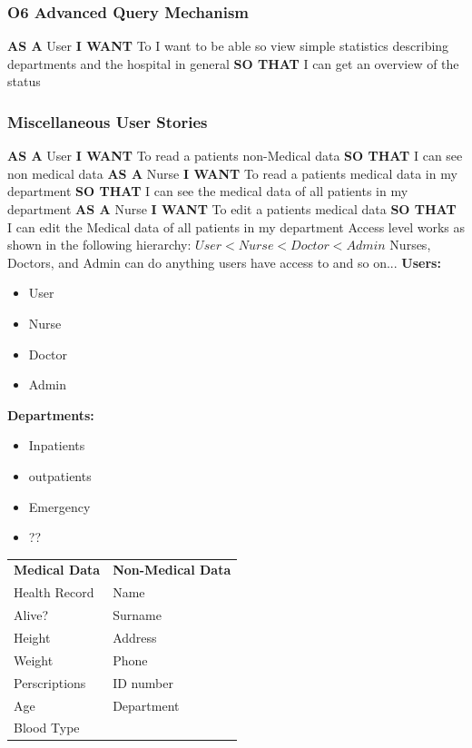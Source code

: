 \subsubsection*{O6 Advanced Query Mechanism}
%
\textbf{AS A} User\hfill \break
\textbf{I WANT} To I want to be able so view simple statistics describing departments and the hospital in general\hfill \break
\textbf{SO THAT} I can get an overview of the status\hfill \medbreak
%
\subsubsection*{Miscellaneous User Stories}
%
\textbf{AS A} User\hfill \break
\textbf{I WANT} To read a patients non-Medical data\hfill \break
\textbf{SO THAT} I can see non medical data\hfill \medbreak
%
\textbf{AS A} Nurse\hfill \break
\textbf{I WANT} To read a patients medical data in my department\hfill \break
\textbf{SO THAT} I can see the medical data of all patients in my department\hfill \medbreak
%
\textbf{AS A} Nurse\hfill \break
\textbf{I WANT} To edit a patients medical data\hfill \break
\textbf{SO THAT} I can edit the Medical data of all patients in my department\hfill \medbreak
%
\newpage
%
Access level works as shown in the following hierarchy:\hfill \break
$User < Nurse < Doctor < Admin$\hfill \bigbreak
%
Nurses, Doctors, and Admin can do anything users have access to and so on...\hfill \bigbreak
%
\textbf{Users:}
\begin{itemize}
    \item User
    \item Nurse
    \item Doctor
    \item Admin
\end{itemize}

\textbf{Departments:}
\begin{itemize}
    \item Inpatients
    \item outpatients
    \item Emergency
    \item ??
\end{itemize}
%
\medbreak
%
\begin{table}[h!]
    \begin{tabular}{ll}
        \textbf{Medical Data} & \textbf{Non-Medical Data} \\
        Health Record         & Name                      \\
        Alive?                & Surname                   \\
        Height                & Address                   \\
        Weight                & Phone                     \\
        Perscriptions         & ID number                 \\
        Age                   & Department                \\
        Blood Type            &                          
    \end{tabular}
\end{table}